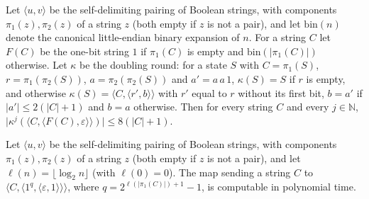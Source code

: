 \begin{theorem}
\label{Complexity.ladner_count_size}
\leanok
{}
Let $\langle u,v\rangle$ be the self-delimiting pairing of Boolean strings, with components $\pi_1(z),\pi_2(z)$ of a string $z$ (both empty if $z$ is not a pair), and let $\mathrm{bin}(n)$ denote the canonical little-endian binary expansion of $n$. For a string $C$ let $F(C)$ be the one-bit string $1$ if $\pi_1(C)$ is
empty and $\mathrm{bin}(|\pi_1(C)|)$ otherwise. Let $\kappa$ be the doubling round: for a state
$S$ with $C=\pi_1(S)$, $r=\pi_1(\pi_2(S))$, $a=\pi_2(\pi_2(S))$ and $a'=a\,a\,1$, $\kappa(S)=S$ if
$r$ is empty, and otherwise $\kappa(S)=\langle C,\langle r',b\rangle\rangle$ with $r'$ equal to $r$
without its first bit, $b=a'$ if $|a'|\le 2(|C|+1)$ and $b=a$ otherwise. Then for every string $C$
and every $j\in\mathbb N$,
$\bigl|\kappa^{j}(\langle C,\langle F(C),\varepsilon\rangle\rangle)\bigr|\le 8(|C|+1)$.
\end{theorem}

\begin{theorem}
\label{Complexity.ladner_testInit_FP}
\leanok
{}
Let $\langle u,v\rangle$ be the self-delimiting pairing of Boolean strings, with components $\pi_1(z),\pi_2(z)$ of a string $z$ (both empty if $z$ is not a pair), and let $\ell(n)=\lfloor\log_2 n\rfloor$ (with $\ell(0)=0$). The map sending a string $C$ to
$\langle C,\langle 1^{q},\langle\varepsilon,1\rangle\rangle\rangle$, where
$q=2^{\ell(|\pi_1(C)|)+1}-1$, is computable in polynomial time.
\end{theorem}

